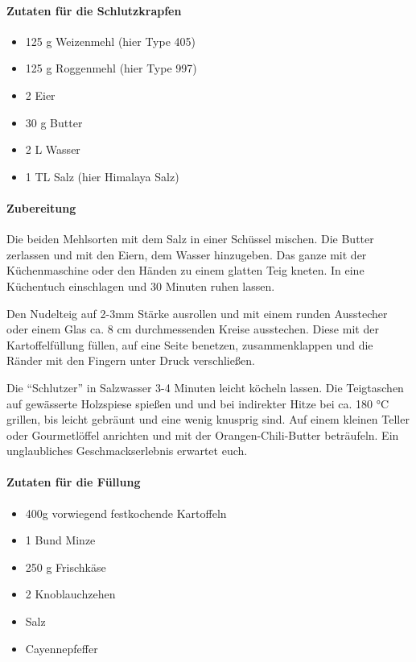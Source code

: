 \paragraph{Zutaten für die Schlutzkrapfen}

\begin{itemize}[noitemsep]
	\item 125 g Weizenmehl (hier Type 405)
	\item 125 g Roggenmehl (hier Type 997)
	\item 2 Eier
	\item 30 g Butter
	\item 2 L Wasser
	\item 1 TL Salz (hier Himalaya Salz)
\end{itemize}

\paragraph{Zubereitung}

Die beiden Mehlsorten mit dem Salz in einer Schüssel mischen. Die Butter zerlassen und mit den Eiern, dem Wasser hinzugeben. Das 
ganze mit der Küchenmaschine oder den Händen zu einem glatten Teig kneten. In eine Küchentuch einschlagen und 30 Minuten ruhen 
lassen.

Den Nudelteig auf 2-3mm Stärke ausrollen und mit einem runden Ausstecher oder einem Glas ca. 8 cm durchmessenden Kreise 
ausstechen. Diese mit der Kartoffelfüllung füllen, auf eine Seite benetzen, zusammenklappen und die Ränder mit den Fingern unter Druck 
verschließen.

Die "`Schlutzer"' in Salzwasser 3-4 Minuten leicht köcheln lassen. Die Teigtaschen auf gewässerte Holzspiese spießen und und bei 
indirekter Hitze bei ca. 180 °C grillen, bis leicht gebräunt und eine wenig knusprig sind. Auf einem kleinen Teller oder Gourmetlöffel 
anrichten und mit der Orangen-Chili-Butter beträufeln. Ein unglaubliches Geschmackserlebnis erwartet euch.

\paragraph{Zutaten für die Füllung}

\begin{itemize}[noitemsep]
	\item 400g vorwiegend festkochende Kartoffeln
	\item 1 Bund Minze
	\item 250 g Frischkäse
	\item 2 Knoblauchzehen
	\item Salz
	\item Cayennepfeffer
\end{itemize}

